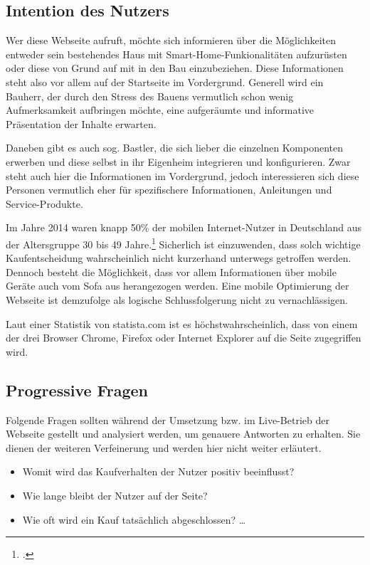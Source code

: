 \subsection{Intention des Nutzers}
Wer diese Webseite aufruft, möchte sich informieren über die Möglichkeiten entweder sein bestehendes Haus mit Smart-Home-Funkionalitäten aufzurüsten oder diese von Grund auf mit in den Bau einzubeziehen. Diese Informationen steht also vor allem auf der Startseite im Vordergrund. Generell wird ein Bauherr, der durch den Stress des Bauens vermutlich schon wenig Aufmerksamkeit aufbringen möchte, eine aufgeräumte und informative Präsentation der Inhalte erwarten.

Daneben gibt es auch sog. Bastler, die sich lieber die einzelnen Komponenten erwerben und diese selbst in ihr Eigenheim integrieren und konfigurieren. Zwar steht auch hier die Informationen im Vordergrund, jedoch interessieren sich diese Personen vermutlich eher für spezifischere Informationen, Anleitungen und Service-Produkte.

Im Jahre 2014 waren knapp 50\% der mobilen Internet-Nutzer in Deutschland aus der Altersgruppe 30 bis 49 Jahre.\footcite[vgl.][]{statista:alter} Sicherlich ist einzuwenden, dass solch wichtige Kaufentscheidung wahrscheinlich nicht kurzerhand unterwegs getroffen werden. Dennoch besteht die Möglichkeit, dass vor allem Informationen über mobile Geräte auch vom Sofa aus herangezogen werden. Eine mobile Optimierung der Webseite ist demzufolge als logische Schlussfolgerung nicht zu vernachlässigen. 

Laut einer Statistik von statista.com ist es höchstwahrscheinlich, dass von einem der drei Browser Chrome, Firefox oder Internet Explorer auf die Seite zugegriffen wird. 

\subsection{Progressive Fragen}
Folgende Fragen sollten während der Umsetzung bzw. im Live-Betrieb der Webseite gestellt und analysiert werden, um genauere Antworten zu erhalten. Sie dienen der weiteren Verfeinerung und werden hier nicht weiter erläutert.
\begin{itemize}
	\item Womit wird das Kaufverhalten der Nutzer positiv beeinflusst? 
	\item Wie lange bleibt der Nutzer auf der Seite? 
	\item Wie oft wird ein Kauf tatsächlich abgeschlossen? \ldots
\end{itemize}
